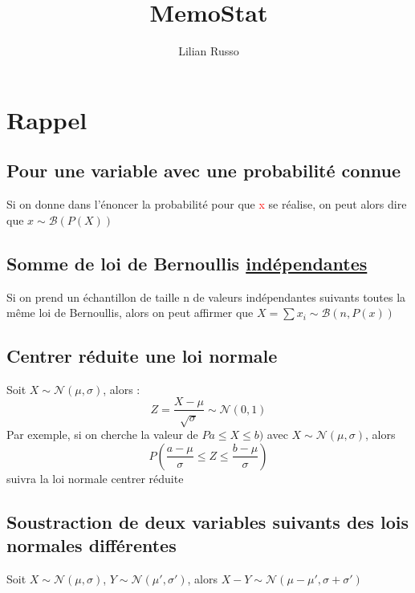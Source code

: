 \documentclass{article}
\title{MemoStat}
\author{Lilian Russo}
\newcommand{\argument}[1]{\textcolor{red}{#1}}
\begin{document}
\maketitle

\tableofcontents

\newpage

\section{Rappel}
\subsection{Pour une variable avec une probabilité connue}
Si on donne dans l'énoncer la probabilité pour que \argument{x} se réalise, on peut alors dire que $x \sim \mathcal{B}(P(X))$

\subsection{Somme de loi de Bernoullis \underline{indépendantes}}
Si on prend un échantillon de taille n de valeurs indépendantes suivants toutes la même loi de Bernoullis, alors on peut affirmer que $X = \sum x_i \sim \mathcal{B}(n,P(x))$

\subsection{Centrer réduite une loi normale}
Soit $X \sim \mathcal{N}(\mu,\sigma)$, alors : 
\begin{equation*}
    Z = \frac{X - \mu}{\sqrt{\sigma}} \sim \mathcal{N}(0,1)
\end{equation*}
Par exemple, si on cherche la valeur de $Pa \leqslant X \leqslant b)$ avec $X \sim \mathcal{N}(\mu,\sigma)$, alors 
\begin{equation*}
    P \left ( \frac{a - \mu}{\sigma} \leqslant Z \leqslant \frac{b-\mu}{\sigma} \right )
\end{equation*}
suivra la loi normale centrer réduite

\subsection{Soustraction de deux variables suivants des lois normales différentes}
\begin{center}
    Soit $X \sim \mathcal{N}(\mu,\sigma)$, $Y \sim \mathcal{N}(\mu',\sigma')$, alors $X-Y \sim \mathcal{N}(\mu - \mu',\sigma + \sigma')$
\end{center}
\end{document}
